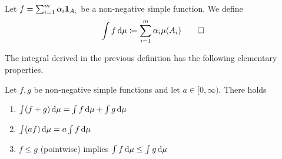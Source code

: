 \begin{definition}\label{def:integral-of-nonnegative-simple-function}
Let $f = \sum_{i=1}^m \alpha_i\mathbf{1}_{A_i}$ be a non-negative simple function.
We define
\begin{equation}\label{eq:integral-of-nonnegative-simple-function}
\int f\,\mathrm{d}\mu
\coloneq
\sum_{i=1}^m \alpha_i\mu(A_i)
\qedhere
\end{equation}
\end{definition}

The integral derived in the previous definition has the following elementary properties.

\begin{lemma}\label{lem:elementary-properties-integral-simple-functions}
Let $f,g$ be non-negative simple functions and let $a \in [0,\infty)$.
There holds
\begin{enumerate}[label=(\roman*)]
\item 
\label{lem:elementary-properties-integral-simple-functions:additivity}
$\int (f+g)\,\mathrm{d}\mu = \int f\,\mathrm{d}\mu + \int g\,\mathrm{d}\mu$
\item 
\label{lem:elementary-properties-integral-simple-functions:homogeneity}
$\int (af)\,\mathrm{d}\mu = a\int f\,\mathrm{d}\mu$
\item 
\label{lem:elementary-properties-integral-simple-functions:monotonicity}
$f \leq g$ (pointwise) implies $\int f\,\mathrm{d}\mu \leq \int g\,\mathrm{d}\mu$
\qedhere
\end{enumerate}
\end{lemma}
